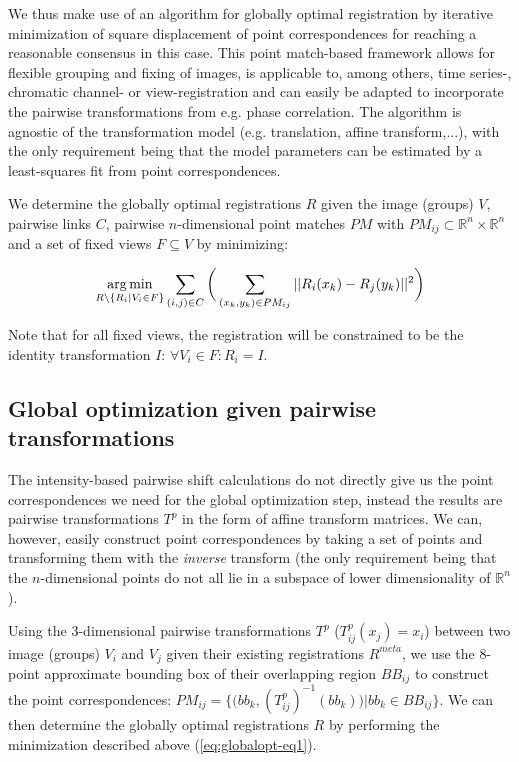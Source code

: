 We thus make use of an algorithm for globally optimal registration by iterative minimization of square displacement of point correspondences\cite{saalfeld2010rigid, saalfeld2012elastic} for reaching a reasonable consensus in this case. This point match-based framework allows for flexible grouping and fixing of images, is applicable to, among others, time series-, chromatic channel- or view-registration and can easily be adapted to incorporate the pairwise transformations from e.g. phase correlation. The algorithm is agnostic of the transformation model (e.g. translation, affine transform,...), with the only requirement being that the model parameters can be estimated by a least-squares fit from point correspondences.

We determine the globally optimal registrations $R$ given the image (groups) $V$, pairwise links $C$, pairwise $n$-dimensional point matches $PM$ with $PM_{ij} \subset \mathbb{R}^n \times  \mathbb{R}^n$ and a set of fixed views $F \subseteq V$ by minimizing:

\begin{equation}
\label{eq:globalopt-eq1}
\operatorname*{arg\,min}_{R \setminus \{R_i | V_i \in F\}} \sum_{(i,j) \in C} \bigg( \sum_{(x_{k}, y_{k}) \in PM_{ij}} || R_{i}( x_{k}) - R_{j}( y_{k}) ||^2 \bigg)
\end{equation}

Note that for all fixed views, the registration will be constrained to be the identity transformation $I$: $\forall V_i \in F: R_{i} = I$.

\subsection*{Global optimization given pairwise transformations}

The intensity-based pairwise shift calculations do not directly give us the point correspondences we need for the global optimization step, instead the results are pairwise transformations $T^{p}$ in the form of affine transform matrices. We can, however, easily construct point correspondences by taking a set of points and transforming them with the \emph{inverse} transform (the only requirement being that the $n$-dimensional points do not all lie in a subspace of lower dimensionality of $\mathbb{R}^n$).  

Using the 3-dimensional pairwise transformations $T^{p}$ ($T^p_{ij} (x_{j}) = x_i$) between two image (groups) $V_i$ and $V_j$ given their existing registrations $R^{meta}$, we use the 8-point approximate bounding box of their overlapping region $BB_{ij}$ to construct the point correspondences: $PM_{ij} = \{ \big(bb_k, (T^p_{ij})^{-1}(bb_k) \big) | bb_k \in BB_{ij}\}$. We can then determine the globally optimal registrations $R$ by performing the minimization described above (\ref{eq:globalopt-eq1}).  

